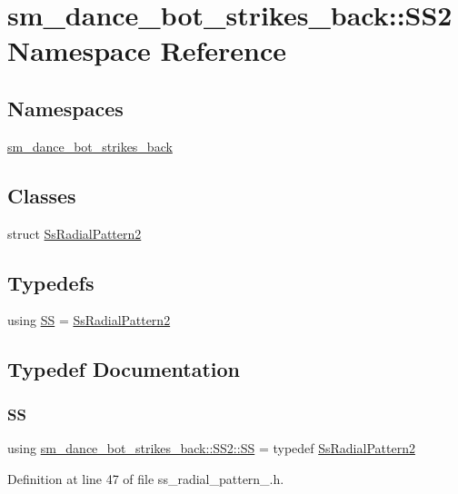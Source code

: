 \hypertarget{namespacesm__dance__bot__strikes__back_1_1SS2}{}\section{sm\+\_\+dance\+\_\+bot\+\_\+strikes\+\_\+back\+:\+:S\+S2 Namespace Reference}
\label{namespacesm__dance__bot__strikes__back_1_1SS2}
\subsection*{Namespaces}
\begin{DoxyCompactItemize}
\item 
 \hyperlink{namespacesm__dance__bot__strikes__back_1_1SS2_1_1sm__dance__bot__strikes__back}{sm\+\_\+dance\+\_\+bot\+\_\+strikes\+\_\+back}
\end{DoxyCompactItemize}
\subsection*{Classes}
\begin{DoxyCompactItemize}
\item 
struct \hyperlink{structsm__dance__bot__strikes__back_1_1SS2_1_1SsRadialPattern2}{Ss\+Radial\+Pattern2}
\end{DoxyCompactItemize}
\subsection*{Typedefs}
\begin{DoxyCompactItemize}
\item 
using \hyperlink{namespacesm__dance__bot__strikes__back_1_1SS2_a0f9daf19a622a6005f9fe45e95593c3f}{SS} = \hyperlink{structsm__dance__bot__strikes__back_1_1SS2_1_1SsRadialPattern2}{Ss\+Radial\+Pattern2}
\end{DoxyCompactItemize}


\subsection{Typedef Documentation}
\mbox{\label{namespacesm__dance__bot__strikes__back_1_1SS2_a0f9daf19a622a6005f9fe45e95593c3f}} 
\subsubsection{\texorpdfstring{SS}{SS}}
{\footnotesize\ttfamily using \hyperlink{namespacesm__dance__bot__strikes__back_1_1SS2_a0f9daf19a622a6005f9fe45e95593c3f}{sm\+\_\+dance\+\_\+bot\+\_\+strikes\+\_\+back\+::\+S\+S2\+::\+SS} = typedef \hyperlink{structsm__dance__bot__strikes__back_1_1SS2_1_1SsRadialPattern2}{Ss\+Radial\+Pattern2}}



Definition at line 47 of file ss\+\_\+radial\+\_\+pattern\+\_.\+h.

